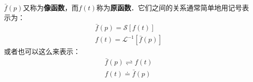 $\bar f(p)$又称为\textbf{像函数}，而$f(t)$称为\textbf{原函数}．它们之间的关系通常简单地用记号表示为：
\begin{equation}
\begin{array}{l}\bar{f}(p)=\mathscr{S}[f(t)] \\ f(t)=\mathscr{L}^{-1}[\bar{f}(p)]\end{array}
\end{equation}
或者也可以这么来表示：
\begin{equation}
\begin{array}{l}\bar{f}(p) \rightleftharpoons f(t) \\ f(t) \doteq \bar{f}(p)\end{array}
\end{equation}